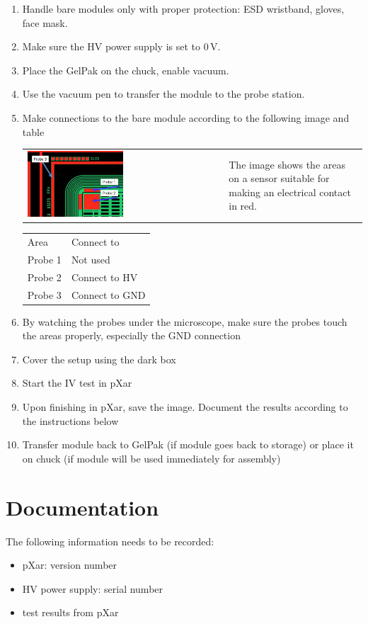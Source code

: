 \documentclass[10pt]{unlsilabsop}
\begin{document}
\begin{enumerate}
\item Handle bare modules only with proper protection: ESD wristband, gloves, face mask.
\item Make sure the HV power supply is set to 0\,V.
\item Place the GelPak on the chuck, enable vacuum.
\item Use the vacuum pen to transfer the module to the probe station.
\item Make connections to the bare module according to the following image and table

\begin{tabular}{p{}p{}}
\includegraphics[width=0.5\textwidth]{img/SensorProbePositions.png} &
The image shows the areas on a sensor suitable for making an electrical contact in red.
\end{tabular}

\begin{tabular}{ll}
Area & Connect to \\
Probe 1 & Not used \\
Probe 2 & Connect to HV \\
Probe 3 & Connect to GND \\
\end{tabular}
\item By watching the probes under the microscope, make sure the probes touch the areas properly, especially the GND connection
\item Cover the setup using the dark box
\item Start the IV test in pXar
\item Upon finishing in pXar, save the image. Document the results according to the instructions below
\item Transfer module back to GelPak (if module goes back to storage) or place it on chuck (if module will be used immediately for assembly)
\end{enumerate}

\section{Documentation}
The following information needs to be recorded:
\begin{itemize}
\item pXar: version number
\item HV power supply: serial number
\item test results from pXar
\end{itemize}
\end{document}
